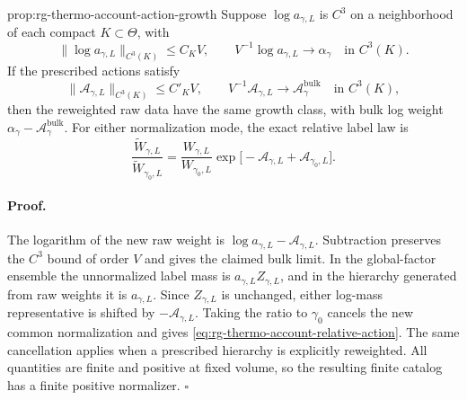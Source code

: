 {prop:rg-thermo-account-action-growth}
Suppose $\log a_{\gamma,L}$ is $C^3$ on a neighborhood of each
compact $K\subset\Theta$, with
\begin{equation}
 \|\log a_{\gamma,L}\|_{C^3(K)}\leq C_KV,
 \qquad V^{-1}\log a_{\gamma,L}\longrightarrow\alpha_\gamma
                       \quad\text{in }C^3(K).
 \label{eq:rg-thermo-account-raw-growth}
\end{equation}
If the prescribed actions satisfy
\begin{equation}
 \|\mathscr A_{\gamma,L}\|_{C^3(K)}\leq C'_KV,
 \qquad V^{-1}\mathscr A_{\gamma,L}
       \longrightarrow\mathscr A_\gamma^{\mathrm{bulk}}
                       \quad\text{in }C^3(K),
 \label{eq:rg-thermo-account-action-admission}
\end{equation}
then the reweighted raw data have the same growth class, with bulk
log weight $\alpha_\gamma-\mathscr A_\gamma^{\mathrm{bulk}}$.
For either normalization mode, the exact relative label law is
\begin{equation}
 \frac{\widetilde W_{\gamma,L}}{\widetilde W_{\gamma_0,L}}
 =\frac{W_{\gamma,L}}{W_{\gamma_0,L}}
   \exp\bigl[-\mathscr A_{\gamma,L}
                   +\mathscr A_{\gamma_0,L}\bigr].
 \label{eq:rg-thermo-account-relative-action}
\end{equation}\thermoestablishedstatus


\paragraph{Proof.}
The logarithm of the new raw weight is
$\log a_{\gamma,L}-\mathscr A_{\gamma,L}$. Subtraction preserves
the $C^3$ bound of order $V$ and gives the claimed bulk limit.
In the global-factor ensemble the unnormalized label mass is
$a_{\gamma,L}Z_{\gamma,L}$, and in the hierarchy generated from
raw weights it is $a_{\gamma,L}$. Since $Z_{\gamma,L}$ is unchanged,
either log-mass representative is shifted by
$-\mathscr A_{\gamma,L}$. Taking the ratio to $\gamma_0$ cancels
the new common normalization and gives
\cref{eq:rg-thermo-account-relative-action}. The same cancellation
applies when a prescribed hierarchy is explicitly reweighted. All
quantities are finite and positive at fixed volume, so the resulting
finite catalog has a finite positive normalizer. $\square$

